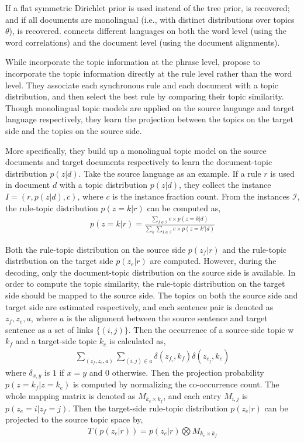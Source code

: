 If a flat symmetric Dirichlet prior is used instead of the tree prior, \plda{} is recovered; and if all documents are monolingual (i.e., with distinct distributions over topics $\theta$), \tlda{} is recovered. \ptlda{} connects different languages on both the word level (using the word correlations) and the document level (using the document alignments).

While \citet{hu-14} incorporate the topic information at the phrase level, \citet{xiao-12} propose to incorporate the topic information directly at the rule level rather than the word level. They associate each synchronous rule and each document with a topic distribution, and then select the best rule by comparing their topic similarity. Though monolingual topic models are applied on the source language and target language respectively, they learn the projection between the topics on the target side and the topics on the source side.

More specifically, they build up a monolingual topic model on the source documents and target documents respectively to learn the document-topic distribution $p(z|d)$. Take the source language as an example. If a rule $r$ is used in document $d$ with a topic distribution $p(z|d)$, they collect the instance $I=(r, p(z|d), c)$, where $c$ is the instance fraction count. From the instances $\mathcal{I}$, the rule-topic distribution $p(z=k|r)$ can be computed as,
\begin{align}
p(z=k|r) = \frac{\sum_{I \in \mathcal{I}} c \times p(z=k|d)}{\sum_k \sum_{I \in \mathcal{I}} c \times p(z=k'|d)}
\end{align}

Both the rule-topic distribution on the source side $p(z_f|r)$ and the rule-topic distribution on the target side $p(z_e|r)$ are computed. However, during the decoding, only the document-topic distribution on the source side is available. In order to compute the topic similarity, the rule-topic distribution on the target side should be mapped to the source side. The topics on both the source side and target side are estimated respectively,  and each sentence pair is denoted as $z_f, z_e, a$, where $a$ is the alignment between the source sentence and target sentence as a set of links $\{(i,j)\}$. Then the occurrence of a source-side topic w$k_f$ and a target-side topic $k_e$ is calculated as,
\begin{align}
\sum_{(z_f,z_e,a)} \sum_{(i,j) \in a} \delta(z_{f_i}, k_f) \delta(z_{e_j}, k_e)
\end{align}
where $\delta_{x,y}$ is $1$ if $x=y$ and $0$ otherwise. Then the projection probability $p(z=k_f | z=k_e)$ is computed by normalizing the co-occurrence count. The whole mapping matrix is denoted as $M_{k_e \times k_f}$, and each entry $M_{i,j}$ is $p(z_e=i | z_f=j)$. Then the target-side rule-topic distribution $p(z_e|r)$ can be projected to the source topic space by,
\begin{align}
T(p(z_e|r)) = p(z_e|r) \bigotimes M_{k_e \times k_f}
\end{align}

